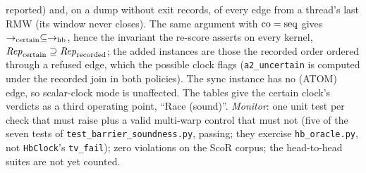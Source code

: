 \documentclass[11pt]{article}
\theoremstyle{remark}
\begin{document}
reported) and, on a dump without exit records, of every edge from a thread's last RMW (its
window never closes). The same argument with $\mathrm{co}=\operatorname{seq}$ gives
$\to_{\mathrm{certain}}\subseteq\to_{\mathrm{hb}}$, hence the invariant the re-score asserts on every kernel,
$\mathit{Rep}_{\mathrm{certain}}\supseteq\mathit{Rep}_{\mathrm{recorded}}$; the added instances are those the
recorded order ordered through a refused edge, which the possible clock flags
(\texttt{a2\_uncertain} is computed under the recorded join in both policies). The sync
instance has no (ATOM) edge, so scalar-clock mode is unaffected. The tables give the certain
clock's verdicts as a third operating point, ``Race (sound)''.
\emph{Monitor}: one unit test
per check that must raise plus a valid multi-warp control that must not (five of the seven
tests of \texttt{test\_barrier\_soundness.py}, passing; they exercise \texttt{hb\_oracle.py},
not \texttt{HbClock}'s \texttt{tv\_fail}); zero violations on the ScoR corpus; the
head-to-head suites are not yet counted.
\end{document}
